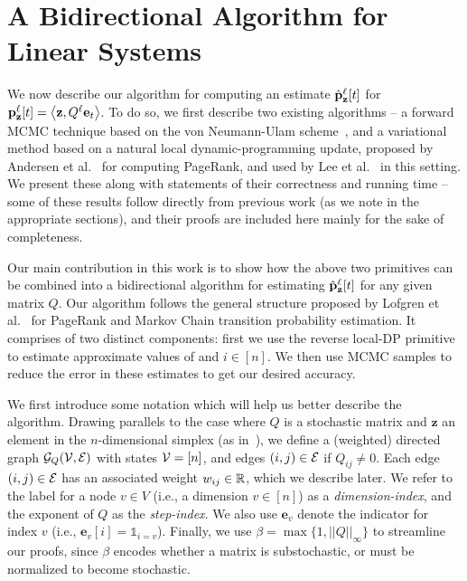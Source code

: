 \section{A Bidirectional Algorithm for Linear Systems}

We now describe our algorithm for computing an estimate $\hat{\mathbf{p}}_\mathbf{z}^{\ell}[t]$ for ${\mathbf{p}}_\mathbf{z}^{\ell}[t] =\left< \mathbf{z}, Q^{\ell}\mathbf{e}_t \right>$.
To do so, we first describe two existing algorithms -- a forward MCMC technique based on the von Neumann-Ulam scheme~\cite{Wasow1952,ji2013convergence}, and a variational method based on a natural local dynamic-programming update, proposed by Andersen et al.~\cite{andersen2007local} for computing PageRank, and used by Lee et al.~\cite{lee2014asynchronous} in this setting. 
We present these along with statements of their correctness and running time -- some of these results follow directly from previous work (as we note in the appropriate sections), and their proofs are included here mainly for the sake of completeness.


Our main contribution in this work is to show how the above two primitives can be combined into a bidirectional algorithm for estimating $\hat{\mathbf{p}}_\mathbf{z}^{\ell}[t]$ for any given matrix $Q$. 
Our algorithm follows the general structure proposed by Lofgren et al.~\cite{Lofgren2014,banerjee2015fast} for PageRank and Markov Chain transition probability estimation.
It comprises of two distinct components: first we use the reverse local-DP primitive to estimate approximate values of  and $i\in[n]$. 
We then use MCMC samples to reduce the error in these estimates to get our desired accuracy.


We first introduce some notation which will help us better describe the algorithm.
Drawing parallels to the case where $Q$ is a stochastic matrix and $\mathbf{z}$ an element in the $n$-dimensional simplex (as in~\cite{banerjee2015fast}), we define a (weighted) directed graph ${\mathcal{G}}_Q({\mathcal{V}},{\mathcal{E}})$ with states ${\mathcal{V}} = [n]$, and edges $(i,j)\in {\mathcal{E}}$ if $Q_{ij}\neq 0$. 
Each edge $(i,j)\in{\mathcal{E}}$ has an associated weight $w_{ij}\in\mathbb{R}$, which we describe later.
We refer to the label for a node $v\in V$ (i.e., a dimension $v\in[n]$) as a \emph{dimension-index}, and the exponent of $Q$ as the \emph{step-index}.
We also use $\mathbf{e}_v$ denote the indicator for index $v$ (i.e., $\mathbf{e}_v[i] = \mathds{1}_{i=v}$). 
Finally, we use $\beta = \max\{1, ||Q||_\infty\}$ to streamline our proofs, since $\beta$ encodes whether a matrix is substochastic, or must be normalized to become stochastic.


